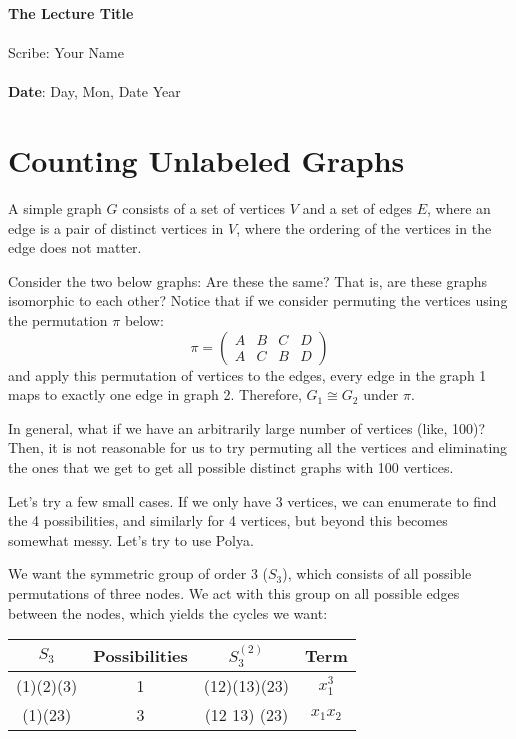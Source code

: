 \documentclass[11pt,twosided]{article}
\def\titlestring{The Lecture Title}
\def\scribestring{Your Name}
\def\datestring{Day, Mon, Date Year}
\begin{document}
\thispagestyle{plain}  %

\noindent
{\LARGE \textbf{\titlestring}}\\\\
%
{\Large Scribe: \scribestring}\\ \\
{\textbf{Date}: \datestring}


\noindent

\section{Counting Unlabeled Graphs}
A simple graph $G$ consists of a set of vertices $V$ and a set of edges $E$, where an edge is a pair of distinct vertices in $V$, where the ordering of the vertices in the edge does not matter. 

Consider the two below graphs: 
Are these the same? That is, are these graphs isomorphic to each other? Notice that if we consider permuting the vertices using the permutation $\pi$ below: 
\[
	\pi = \begin{pmatrix}
	A & B & C & D\\
	A & C & B & D
	\end{pmatrix}
\]	
and apply this permutation of vertices to the edges, every edge in the graph 1 maps to exactly one edge in graph 2. Therefore, $G_1 \cong G_2$ under $\pi$.

In general, what if we have an arbitrarily large number of vertices (like, 100)? Then, it is not reasonable for us to try permuting all the vertices and eliminating the ones that we get to get all possible distinct graphs with 100 vertices. 

Let's try a few small cases. If we only have 3 vertices, we can enumerate to find the 4 possibilities, and similarly for 4 vertices, but beyond this becomes somewhat messy. Let's try to use Polya.

We want the symmetric group of order 3 ($S_3$), which consists of all possible permutations of three nodes. We act with this group on all possible edges between the nodes, which yields the cycles we want: 

\begin{center}
\begin{tabular}{c | c | c | c}
 $S_3$ & Possibilities & $S_3^{(2)}$ & Term \\ \hline
(1)(2)(3) & 1 & (12)(13)(23) & $x_1^3$ \\
(1)(23) & 3 & (12 13) (23) & $x_1 x_2$ \\



\end{tabular}
\end{center}
\end{document}
